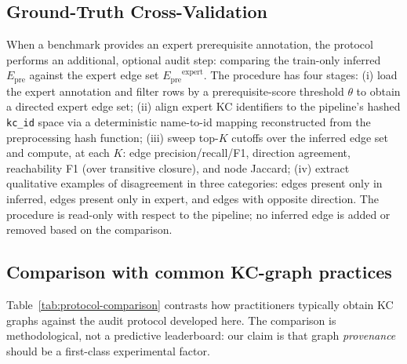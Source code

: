 \documentclass[preprint,10pt,doubleblind]{elsarticle}
\newcommand{\Epre}{\ensuremath{E_{\text{pre}}}}
\begin{document}
\subsection{Ground-Truth Cross-Validation}
\label{sec:gtxv-protocol}
When a benchmark provides an expert prerequisite annotation, the
protocol performs an additional, optional audit step: comparing the
train-only inferred $\Epre$ against the expert edge set
$\Epre^{\text{expert}}$. The procedure has four stages:
(i) load the expert annotation and filter rows by a prerequisite-score
threshold $\theta$ to obtain a directed expert edge set;
(ii) align expert KC identifiers to the pipeline's hashed \texttt{kc\_id}
space via a deterministic name-to-id mapping reconstructed from the
preprocessing hash function;
(iii) sweep top-$K$ cutoffs over the inferred edge set and compute,
at each $K$: edge precision/recall/F1, direction agreement, reachability
F1 (over transitive closure), and node Jaccard;
(iv) extract qualitative examples of disagreement in three categories:
edges present only in inferred, edges present only in expert, and edges
with opposite direction.
The procedure is read-only with respect to the pipeline; no
inferred edge is added or removed based on the comparison.

\subsection{Comparison with common KC-graph practices}
\label{sec:protocol-comparison}
Table~\ref{tab:protocol-comparison} contrasts how practitioners typically
obtain KC graphs against the audit protocol developed here. The comparison
is methodological, not a predictive leaderboard: our claim is that graph
\emph{provenance} should be a first-class experimental factor.
\end{document}
